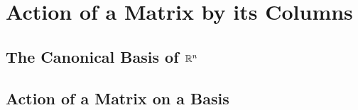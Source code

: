 \documentclass[elementsmain.tex]{subfiles}
\begin{document}
\section{Action of a Matrix by its Columns}

\subsection*{The Canonical Basis of $\mathbb{R}^n$}


\subsection*{Action of a Matrix on a Basis}




\clearpage
\end{document}
